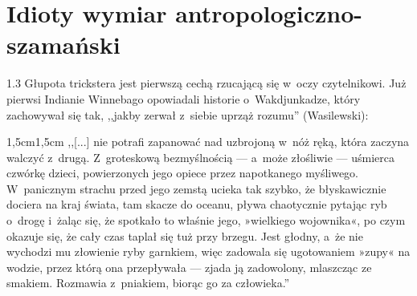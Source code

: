 \documentclass[11pt,a4paper,twoside]{report}
\begin{document}
\section{Idioty wymiar antropologiczno-szamański}
\begin{spacing}{1.3}
Głupota trickstera jest pierwszą cechą rzucającą się w~oczy czytelnikowi. Już pierwsi Indianie Winnebago opowiadali historie o~Wakdjunkadze, który zachowywał się tak, ,,jakby zerwał z~siebie uprząż rozumu'' (Wasilewski):
\end{spacing}
\pagebreak
\vspace*{0.5\baselineskip}
\begin{adjustwidth}{1,5cm}{1,5cm}
\small{
,,[...] nie potrafi zapanować nad uzbrojoną w~nóż ręką, która zaczyna walczyć z~drugą. Z~groteskową bezmyślnością --- a~może złośliwie --- uśmierca czwórkę dzieci, powierzonych jego opiece przez napotkanego myśliwego. W~panicznym strachu przed jego zemstą ucieka tak szybko, że błyskawicznie dociera na kraj świata, tam skacze do oceanu, pływa chaotycznie pytając ryb o~drogę i~żaląc się, że spotkało to właśnie jego, »wielkiego wojownika«, po czym okazuje się, że cały czas taplał się tuż przy brzegu. Jest głodny, a~że nie wychodzi mu złowienie ryby garnkiem, więc zadowala się ugotowaniem »zupy« na wodzie, przez którą ona przepływała --- zjada ją zadowolony, mlaszcząc ze smakiem. Rozmawia z~pniakiem, biorąc go za człowieka.''\\
}
\end{adjustwidth}
\end{document}

